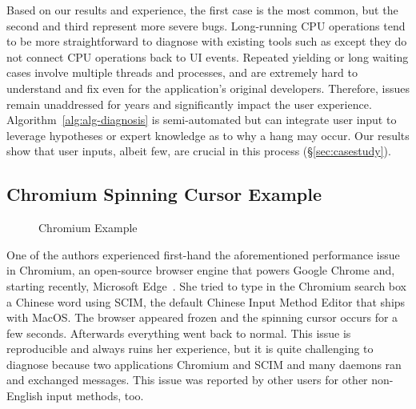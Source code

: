 Based on our results and experience, the first case is the most common, but the
second and third represent more severe bugs. Long-running CPU operations tend to
be more straightforward to diagnose with existing tools such as \spindump except
they do not connect CPU operations back to UI events. Repeated yielding or
long waiting cases involve multiple threads and processes, and are extremely
hard to understand and fix even for the application's original developers.
Therefore, issues remain unaddressed for years and significantly impact the
user experience. Algorithm~\ref{alg:alg-diagnosis} is semi-automated but can
integrate user input to leverage hypotheses or expert knowledge
as to why a hang may occur. Our results show that user inputs, albeit few, are
crucial in this process (\S\ref{sec:casestudy}).

\subsection{Chromium Spinning Cursor Example}

\begin{figure}[htb!]
    \centering
	
    \caption{Chromium Example}
    \label{fig:chromium-case-study}
\end{figure}

One of the authors experienced first-hand the aforementioned performance issue
in Chromium, an open-source browser engine that powers Google Chrome and,
starting recently, Microsoft Edge~\cite{chromiumurl}.  She tried to type in the
Chromium search box a Chinese word using SCIM, the default Chinese Input Method
Editor that ships with MacOS.  The browser appeared frozen and the spinning
cursor occurs for a few seconds.  Afterwards everything went back to normal.
This issue is reproducible and always ruins her experience, but it is quite
challenging to diagnose because two applications Chromium and SCIM and many
daemons ran and exchanged messages.  This issue was reported by other users for
other non-English input methods, too.

